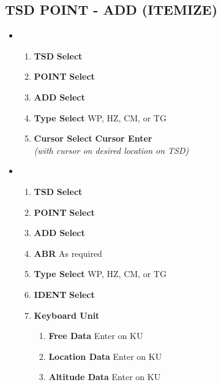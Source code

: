 \documentclass[fontInter]{TechCheck}
\begin{document}
	\clearpage

	\subsection{TSD POINT - ADD (ITEMIZE)}
	\begin{itemize}[leftmargin=0.1\linewidth,rightmargin=0.1\linewidth, itemsep=4pt]
		\item {}
		\begin{enumerate}[itemsep=4pt]
			\item \textbf{TSD} \dotfill \textbf{Select}
			\item \textbf{POINT} \dotfill \textbf{Select}
			\item \textbf{ADD} \dotfill \textbf{Select}
			\item \textbf{Type Select} \dotfill WP, HZ, CM, or TG 
			\item \textbf{Cursor Select} \dotfill \textbf{Cursor Enter} \\
			\hfill \emph{(with cursor on desired location on TSD)}
		\end{enumerate}
		\item {}
		\begin{enumerate}[itemsep=4pt]
			\item \textbf{TSD} \dotfill \textbf{Select}
			\item \textbf{POINT} \dotfill \textbf{Select}
			\item \textbf{ADD} \dotfill \textbf{Select}
			\item \textbf{ABR} \dotfill As required
			\item \textbf{Type Select} \dotfill WP, HZ, CM, or TG 
			\item \textbf{IDENT} \dotfill \textbf{Select}
			\item \textbf{Keyboard Unit}
			\begin{enumerate}[itemsep=4pt]
				\item \textbf{Free Data} \dotfill Enter on KU
				\item \textbf{Location Data} \dotfill Enter on KU
				\item \textbf{Altitude Data} \dotfill Enter on KU
			\end{enumerate}
		\end{enumerate}
	\end{itemize}
\end{document}
